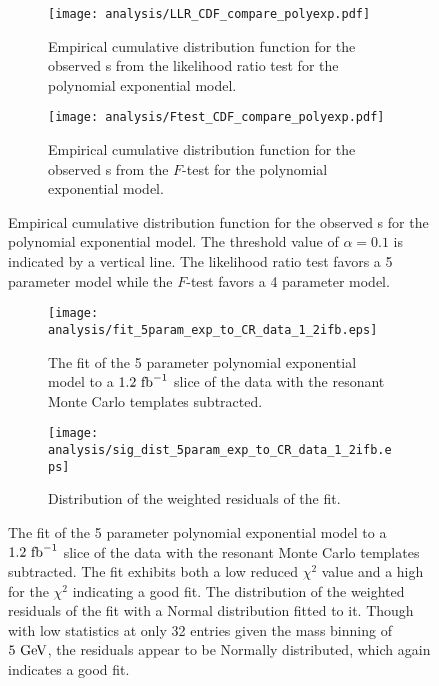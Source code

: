 \begin{figure}[htbp]
 \centering
 \begin{subfigure}[t]{0.48\textwidth}
  \centering
  \texttt{[image: analysis/LLR\_CDF\_compare\_polyexp.pdf]}
  \caption[Empirical cumulative distribution function from the likelihood ratio test comparison for the polynomial exponential fit models.]{%
   Empirical cumulative distribution function for the observed \pvalue{}s from the likelihood ratio test for the polynomial exponential model.}
  \label{fig:LLR_CDF}
 \end{subfigure}%
 \quad
 \begin{subfigure}[t]{0.48\textwidth}
  \centering
  \texttt{[image: analysis/Ftest\_CDF\_compare\_polyexp.pdf]}
  \caption[Empirical cumulative distribution function from the $F$-test comparison for the polynomial exponential fit models.]{%
   Empirical cumulative distribution function for the observed \pvalue{}s from the $F$-test for the polynomial exponential model.}
  \label{fig:Ftest_CDF}
 \end{subfigure}
 \caption{Empirical cumulative distribution function for the observed \pvalue{}s for the polynomial exponential model.
  The threshold value of $\alpha=0.1$ is indicated by a vertical line.
  The likelihood ratio test favors a 5 parameter model while the $F$-test favors a 4 parameter model.}
 \label{fig:empirical_CDF_polyexp}
\end{figure}

\begin{figure}[htbp]
 \centering
 \begin{subfigure}[t]{0.48\textwidth}
  \centering
  \texttt{[image: analysis/fit\_5param\_exp\_to\_CR\_data\_1\_2ifb.eps]}
  \caption[The fit of the 5 parameter polynomial exponential model to a slice of the \CRQCD{} data.]{%
   The fit of the 5 parameter polynomial exponential model to a $1.2~\mathrm{fb}^{-1}$ slice of the \CRQCD{} data with the resonant Monte Carlo templates subtracted.}
  \label{fig:5param_model_fit}
 \end{subfigure}%
 \quad
 \begin{subfigure}[t]{0.48\textwidth}
  \centering
  \texttt{[image: analysis/sig\_dist\_5param\_exp\_to\_CR\_data\_1\_2ifb.eps]}
  \caption[Distribution of the weighted residuals of the fit.]{%
   Distribution of the weighted residuals of the fit.}
  \label{fig:5param_model_sig_dist}
 \end{subfigure}
 \caption[The fit and fit residuals of the 5 parameter polynomial exponential model to a slice of the \CRQCD{} data.]{%
  The fit of the 5 parameter polynomial exponential model to a $1.2~\mathrm{fb}^{-1}$ slice of the \CRQCD{} data with the resonant Monte Carlo templates subtracted.
  The fit exhibits both a low reduced $\chi^{2}$ value and a high \pvalue{} for the $\chi^{2}$ indicating a good fit.
  The distribution of the weighted residuals of the fit with a Normal distribution fitted to it.
  Though with low statistics at only 32 entries given the mass binning of $5~\mathrm{GeV}$, the residuals appear to be Normally distributed, which again indicates a good fit.}
 \label{fig:5param_QCD_model_fit}
\end{figure}

